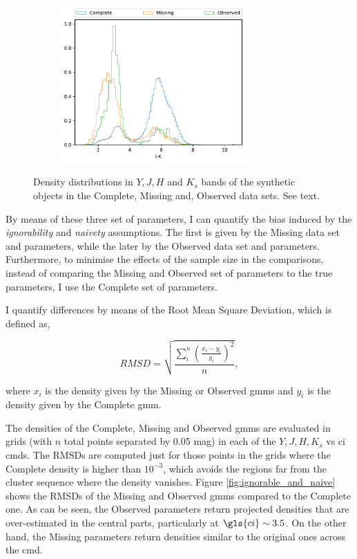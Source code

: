 \begin{figure}[ht!]
\begin{subfigure}[t]{0.45\textwidth}
      \includegraphics[page=5,height=6cm]{background/Figures/Check_distributions.pdf}
    \end{subfigure}
\caption{Density distributions in $Y,J,H$ and $K_s$ bands of the synthetic objects in the Complete, Missing and, Observed data sets. See text.}
\label{fig:ignorability_synthetic}
\end{figure}

By means of these three set of parameters, I can quantify the bias induced by the \emph{ignorability} and \emph{naivety} assumptions. The first is given by the Missing data set and parameters, while the later by the Observed data set and parameters. Furthermore, to minimise the effects of the sample size in the comparisons, instead of comparing the Missing and Observed set of parameters to the true parameters, I  use the Complete set of parameters. 

I quantify differences by means of the Root Mean Square Deviation, which is defined as, 

\begin{equation}
RMSD = \sqrt{\frac{\sum_i^n(\frac{x_i-y_i}{y_i})^2}{n}}, \nonumber
\end{equation}

where $x_i$ is the density given by the Missing or Observed \glspl{gmm} and $y_i$ is the density given by the Complete \gls{gmm}. 

The densities of the Complete, Missing and Observed \glspl{gmm} are evaluated in grids (with $n$ total points separated by 0.05 mag) in each of the $Y,J,H,K_s$ vs \gls{ci} \glspl{cmd}. The RMSDs are computed just for those points in the grids where the Complete density is higher than $10^{-3}$, which avoids the regions far from the cluster sequence where the density vanishes. Figure \ref{fig:ignorable_and_naive} shows the RMSDs of the Missing and Observed \glspl{gmm} compared to the Complete one. As can be seen, the Observed parameters return projected densities that are over-estimated in the central parts, particularly at $\gls{ci}\sim3.5$. On the other hand, the Missing parameters return densities similar to the original ones across the \gls{cmd}.

